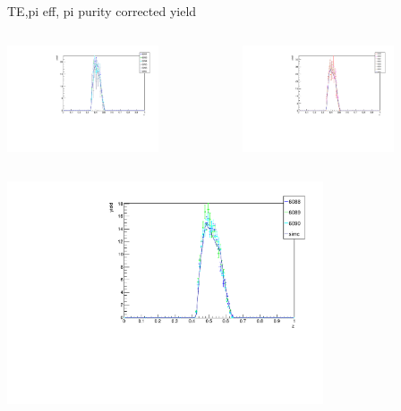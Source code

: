 \begin{frame}{TE,pi eff, pi purity corrected yield}
\begin{columns}
\begin{column}[T]{0.5\textwidth}
\includegraphics[width = 0.7\textwidth]{results/yield/check/yieldcheck_100_neg.pdf}
\end{column}
\begin{column}[T]{0.5\textwidth}
\includegraphics[width = 0.7\textwidth]{results/yield/check/yieldcheck_100_pos.pdf}
\end{column}
\end{columns}
\begin{columns}
\begin{column}[T]{0.5\textwidth}
\includegraphics[width = 0.7\textwidth]{results/yield/check/yieldcheck_90_neg.pdf}

\end{column}
\end{columns}
\end{frame}
